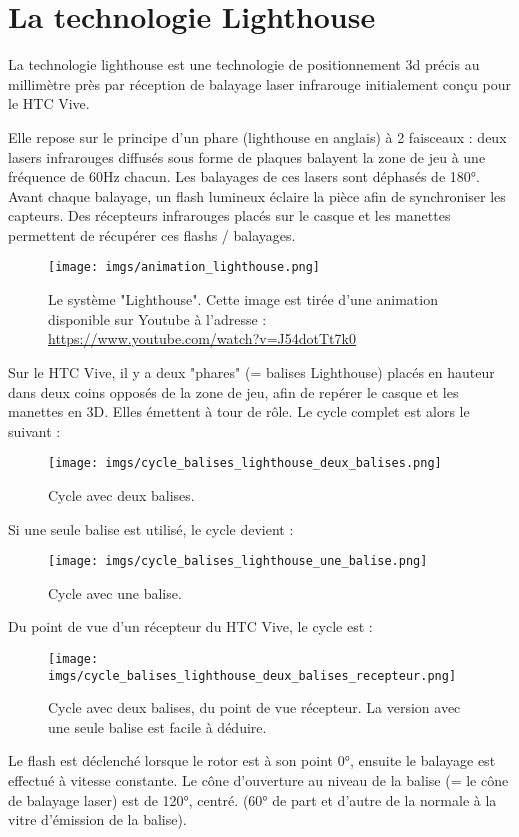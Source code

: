 ﻿\chapter{La technologie Lighthouse}

La technologie lighthouse est une technologie de positionnement 3d précis au millimètre près par réception de balayage laser infrarouge initialement conçu pour le HTC Vive.

Elle repose sur le principe d'un phare (lighthouse en anglais) à 2 faisceaux : deux lasers infrarouges diffusés sous forme de plaques balayent la zone de jeu à une fréquence de 60Hz chacun. Les balayages de ces lasers sont déphasés de 180°. Avant chaque balayage, un flash lumineux éclaire la pièce afin de synchroniser les capteurs. Des récepteurs infrarouges placés sur le casque et les manettes permettent de récupérer ces flashs / balayages.

\begin{figure}[ht]
\begin{center}
\texttt{[image: imgs/animation\_lighthouse.png]}
\end{center}
\caption{Le système "Lighthouse". Cette image est tirée d'une animation disponible sur Youtube à l'adresse : \url{https://www.youtube.com/watch?v=J54dotTt7k0}}
\end{figure}

Sur le HTC Vive, il y a deux "phares" (= balises Lighthouse) placés en hauteur dans deux coins opposés de la zone de jeu, afin de repérer le casque et les manettes en 3D. Elles émettent à tour de rôle. Le cycle complet est alors le suivant :

\begin{figure}[H]
\begin{center}
\texttt{[image: imgs/cycle\_balises\_lighthouse\_deux\_balises.png]}
\end{center}
\caption{Cycle avec deux balises.}
\end{figure}

Si une seule balise est utilisé, le cycle devient :

\begin{figure}[H]
\begin{center}
\texttt{[image: imgs/cycle\_balises\_lighthouse\_une\_balise.png]}
\end{center}
\caption{Cycle avec une balise.}
\end{figure}

Du point de vue d'un récepteur du HTC Vive, le cycle est :

\begin{figure}[H]
\begin{center}
\texttt{[image: imgs/cycle\_balises\_lighthouse\_deux\_balises\_recepteur.png]}
\end{center}
\caption{Cycle avec deux balises, du point de vue récepteur. La version avec une seule balise est facile à déduire.}
\end{figure}

Le flash est déclenché lorsque le rotor est à son point 0°, ensuite le balayage est effectué à vitesse constante. Le cône d'ouverture au niveau de la balise (= le cône de balayage laser) est de 120°, centré. (60° de part et d'autre de la normale à la vitre d'émission de la balise).

